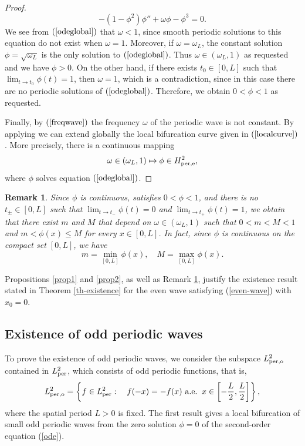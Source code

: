 \documentclass[12pt,reqno]{amsart}
\numberwithin{equation}{section}
\numberwithin{figure}{section}
\newtheorem{remark}[theorem]{Remark}
\begin{document}
\begin{proof}
			\begin{equation}\label{odeglobal}
			-(1-\phi^2)\phi''+\omega\phi-\phi^3=0.
		\end{equation}	
We see from $(\ref{odeglobal})$ that $\omega < 1$, since smooth periodic solutions to this equation do not exist when $\omega = 1$. Moreover, if $\omega = \omega_L$, the constant solution $\phi = \sqrt{\omega_L}$ is the only solution to $(\ref{odeglobal})$. Thus $\omega\in \left(\omega_L,1\right)$ as requested and we have $\phi > 0$. On the other hand, if there exists $t_0\in [0,L]$ such that $\lim_{t\rightarrow t_0}\phi(t)=1$, then $\omega=1$, which is a contradiction, since in this case there are no periodic solutions of $(\ref{odeglobal})$. Therefore, we obtain $0<\phi<1$ as requested. 

Finally, by $(\ref{freqwave})$ the frequency $\omega$ of the periodic wave is not constant. By applying \cite[Theorem 9.1.1]{buffoni-toland} we can extend globally the local bifurcation curve given in $(\ref{localcurve})$. More precisely, there is a continuous mapping
		$$
		\omega \in \left(\omega_L,1\right) \mapsto \phi \in  H_{\rm per,e}^{2},
		$$
		where $\phi$ solves equation $(\ref{odeglobal})$.
		\end{proof}


\begin{remark}\label{boundphi}
Since $\phi$ is continuous, satisfies $0 < \phi < 1$, and there is no $t_{\pm} \in [0, L]$ such that 
$\lim_{t \to t_-} \phi(t) = 0$ and $\lim_{t \to t_+} \phi(t) = 1$, we obtain that there exist $m$ and $M$ that depend on $\omega \in (\omega_L,1)$ such that $0 < m < M<1$ and $m < \phi(x) \leq M$ for every $x \in [0, L]$. In fact, since $\phi$ is continuous on the compact set $[0, L]$, we have 
$$
m = \min_{[0,L]} \phi(x), \quad M =\max_{[0,L]}\phi(x).
$$ 
\end{remark}	

Propositions \ref{prop1} and \ref{prop2}, as well as Remark \ref{boundphi}, justify the existence result stated in Theorem \ref{th-existence} for the even wave satisfying (\ref{even-wave}) with $x_0 = 0$.
		

\subsection{Existence of odd periodic waves}
		\label{sec-2-3}
		
		
		To prove the existence of odd periodic waves, we consider the subspace $L_{\rm per,o}^2$ contained in $L_{\rm per}^2$, which consists of odd periodic functions, that is, 
		$$
		L_{\rm per,o}^2 = \left\{ f\in L_{\rm per}^2 : \quad f(-x)=-f(x)\ {\rm a.e.} \;\; x \in \left[-\frac{L}{2},\frac{L}{2}\right] \right\},
		$$
		where the spatial period $L > 0$ is fixed. The first result gives a local bifurcation of small odd periodic waves from the zero solution $\phi = 0$ of the second-order equation (\ref{ode}).
		
\end{document}
